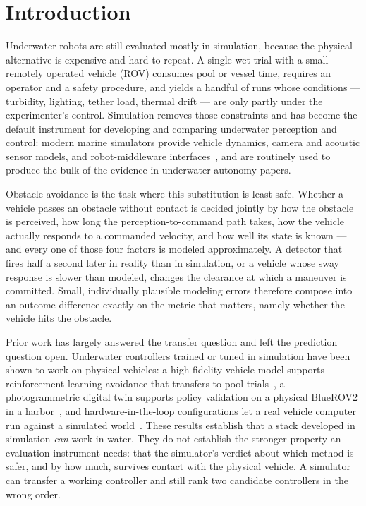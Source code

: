 \section{Introduction}
\label{sec:intro}

Underwater robots are still evaluated mostly in simulation, because the
physical alternative is expensive and hard to repeat. A single wet trial with
a small remotely operated vehicle (ROV) consumes pool or vessel time, requires
an operator and a safety procedure, and yields a handful of runs whose
conditions --- turbidity, lighting, tether load, thermal drift --- are only
partly under the experimenter's control. Simulation removes those constraints
and has become the default instrument for developing and comparing underwater
perception and control: modern marine simulators provide vehicle dynamics,
camera and acoustic sensor models, and robot-middleware
interfaces~\cite{potokar2024holoocea,potokar2022holoocea}, and are routinely
used to produce the bulk of the evidence in underwater autonomy papers.

Obstacle avoidance is the task where this substitution is least safe. Whether
a vehicle passes an obstacle without contact is decided jointly by how the
obstacle is perceived, how long the perception-to-command path takes, how the
vehicle actually responds to a commanded velocity, and how well its state is
known --- and every one of those four factors is modeled approximately. A
detector that fires half a second later in reality than in simulation, or a
vehicle whose sway response is slower than modeled, changes the clearance at
which a maneuver is committed. Small, individually plausible modeling errors
therefore compose into an outcome difference exactly on the metric that
matters, namely whether the vehicle hits the obstacle.

Prior work has largely answered the transfer question and left the prediction
question open. Underwater controllers trained or tuned in simulation have been
shown to work on physical vehicles: a high-fidelity vehicle model supports
reinforcement-learning avoidance that transfers to pool
trials~\cite{zhang2025simtoreal}, a photogrammetric digital twin supports
policy validation on a physical BlueROV2 in a
harbor~\cite{mari2026deeprein}, and hardware-in-the-loop configurations let a
real vehicle computer run against a simulated
world~\cite{meyers2025testinga}. These results establish that a stack
developed in simulation \emph{can} work in water. They do not establish the
stronger property an evaluation instrument needs: that the simulator's verdict
about which method is safer, and by how much, survives contact with the
physical vehicle. A simulator can transfer a working controller and still
rank two candidate controllers in the wrong order.

